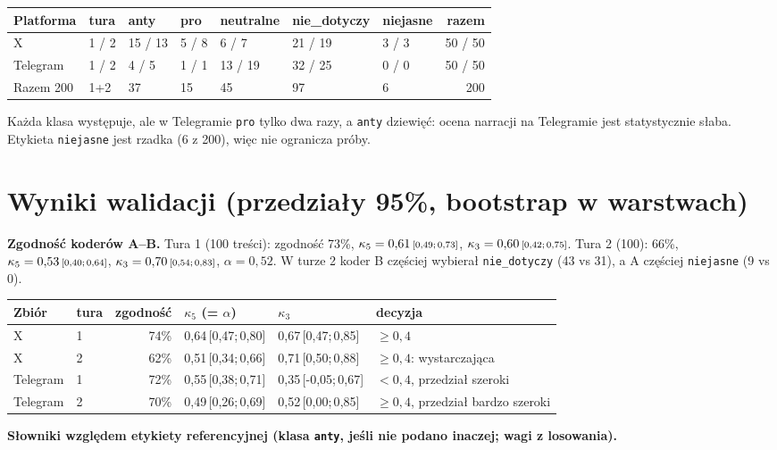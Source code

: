 \documentclass[10pt,a4paper]{article}
\newcommand{\ci}[3]{#1\,\mbox{\scriptsize[#2;\,#3]}}
\begin{document}
\begin{tabularx}{\linewidth}{@{}llXXXXXr@{}}
\toprule
Platforma & tura & anty & pro & neutralne & nie\_dotyczy & niejasne & razem \\
\midrule
X & 1 / 2 & 15 / 13 & 5 / 8 & 6 / 7 & 21 / 19 & 3 / 3 & 50 / 50 \\
Telegram & 1 / 2 & 4 / 5 & 1 / 1 & 13 / 19 & 32 / 25 & 0 / 0 & 50 / 50 \\
Razem 200 & 1+2 & 37 & 15 & 45 & 97 & 6 & 200 \\
\bottomrule
\end{tabularx}
Każda klasa występuje, ale w Telegramie \texttt{pro} tylko dwa razy, a \texttt{anty} dziewięć: ocena narracji na Telegramie jest statystycznie słaba. Etykieta \texttt{niejasne} jest rzadka (6 z 200), więc nie ogranicza próby.

\section{Wyniki walidacji (przedziały 95\%, bootstrap w warstwach)}
\textbf{Zgodność koderów A--B.} Tura 1 (100 treści): zgodność 73\%, $\kappa_5=\ci{0{,}61}{0{,}49}{0{,}73}$, $\kappa_3=\ci{0{,}60}{0{,}42}{0{,}75}$. Tura 2 (100): 66\%, $\kappa_5=\ci{0{,}53}{0{,}40}{0{,}64}$, $\kappa_3=\ci{0{,}70}{0{,}54}{0{,}83}$, $\alpha=0{,}52$. W turze 2 koder B częściej wybierał \texttt{nie\_dotyczy} (43 vs 31), a A częściej \texttt{niejasne} (9 vs 0).

\begin{tabularx}{\linewidth}{@{}llrXXX@{}}
\toprule
Zbiór & tura & zgodność & $\kappa_5$ (= $\alpha$) & $\kappa_3$ & decyzja \\
\midrule
X & 1 & 74\% & \ci{0{,}64}{0{,}47}{0{,}80} & \ci{0{,}67}{0{,}47}{0{,}85} & $\ge 0{,}4$ \\
X & 2 & 62\% & \ci{0{,}51}{0{,}34}{0{,}66} & \ci{0{,}71}{0{,}50}{0{,}88} & $\ge 0{,}4$: wystarczająca \\
Telegram & 1 & 72\% & \ci{0{,}55}{0{,}38}{0{,}71} & \ci{0{,}35}{-0{,}05}{0{,}67} & $<0{,}4$, przedział szeroki \\
Telegram & 2 & 70\% & \ci{0{,}49}{0{,}26}{0{,}69} & \ci{0{,}52}{0{,}00}{0{,}85} & $\ge 0{,}4$, przedział bardzo szeroki \\
\bottomrule
\end{tabularx}

\textbf{Słowniki względem etykiety referencyjnej (klasa \texttt{anty}, jeśli nie podano inaczej; wagi z losowania).}
\end{document}

